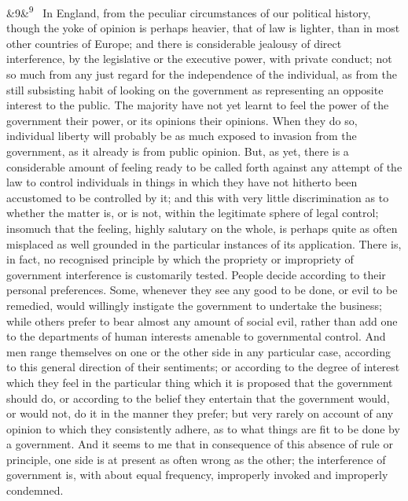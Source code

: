 \documentclass[12pt]{article}
\newcommand{\para}[1][]{\par\noindent\ifx&#1&\else\textsuperscript{\footnotesize #1}~\fi}
\begin{document}
\para[9] In England, from the peculiar circumstances of our political history, though the yoke of opinion is perhaps heavier, that of law is lighter, than in most other countries of Europe; and there is considerable jealousy of direct interference, by the legislative or the executive power, with private conduct; not so much from any just regard for the independence of the individual, as from the still subsisting habit of looking on the government as representing an opposite interest to the public. The majority have not yet learnt to feel the power of the government their power, or its opinions their opinions. When they do so, individual liberty will probably be as much exposed to invasion from the government, as it already is from public opinion. But, as yet, there is a considerable amount of feeling ready to be called forth against any attempt of the law to control individuals in things in which they have not hitherto been accustomed to be controlled by it; and this with very little discrimination as to whether the matter is, or is not, within the legitimate sphere of legal control; insomuch that the feeling, highly salutary on the whole, is perhaps quite as often misplaced as well grounded in the particular instances of its application. There is, in fact, no recognised principle by which the propriety or impropriety of government interference is customarily tested. People decide according to their personal preferences. Some, whenever they see any good to be done, or evil to be remedied, would willingly instigate the government to undertake the business; while others prefer to bear almost any amount of social evil, rather than add one to the departments of human interests amenable to governmental control. And men range themselves on one or the other side in any particular case, according to this general direction of their sentiments; or according to the degree of interest which they feel in the particular thing which it is proposed that the government should do, or according to the belief they entertain that the government would, or would not, do it in the manner they prefer; but very rarely on account of any opinion to which they consistently adhere, as to what things are fit to be done by a government. And it seems to me that in consequence of this absence of rule or principle, one side is at present as often wrong as the other; the interference of government is, with about equal frequency, improperly invoked and improperly condemned.
\end{document}
